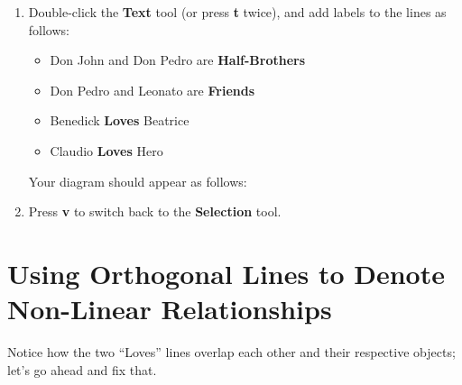 \documentclass[../main.tex]{subfiles}
\begin{document}
\begin{enumerate}
    \begin{itemize}
      \item Click \textbf{Don John} and drag a line to \textbf{Don Pedro}
      \item Click \textbf{Don Pedro} and drag a line to \textbf{Leonato}
      \item Click \textbf{Benedick} and drag a line to \textbf{Beatrice}
      \item Click \textbf{Claudio} and drag a line to \textbf{Hero}
    \end{itemize}
  \item Double-click the \textbf{Text} tool (or press \textbf{t} twice), and add labels to the
    lines as follows:

    \begin{itemize}
      \item Don John and Don Pedro are \textbf{Half-Brothers}
      \item Don Pedro and Leonato are \textbf{Friends}
      \item Benedick \textbf{Loves} Beatrice
      \item Claudio \textbf{Loves} Hero
    \end{itemize}

    Your diagram should appear as follows:

  \item Press \textbf{v} to switch back to the \textbf{Selection} tool.
\end{enumerate}

\section{Using Orthogonal Lines to Denote Non-Linear Relationships}

Notice how the two ``Loves'' lines overlap each other and their respective objects; let's go
ahead and fix that.
\end{document}
